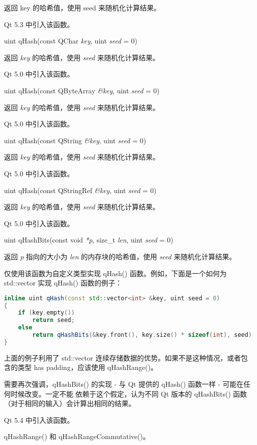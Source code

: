 返回 key 的哈希值，使用 seed 来随机化计算结果。

Qt 5.3 中引入该函数。

uint qHash(const QChar \emph{key}, uint \emph{seed} = 0)

返回 \emph{key} 的哈希值，使用 \emph{seed} 来随机化计算结果。

Qt 5.0 中引入该函数。

uint qHash(const QByteArray \emph{\&key},  uint \emph{seed} = 0)

返回 \emph{key} 的哈希值，使用 \emph{seed} 来随机化计算结果。

Qt 5.0 中引入该函数。

uint qHash(const QString \emph{\&key}, uint \emph{seed} = 0)

返回 \emph{key} 的哈希值，使用 \emph{seed} 来随机化计算结果。

Qt 5.0 中引入该函数。

uint qHash(const QStringRef \emph{\&key}, uint \emph{seed} = 0)

返回 \emph{key} 的哈希值，使用 \emph{seed} 来随机化计算结果。

Qt 5.0 中引入该函数。

uint qHashBits(const void \emph{*p}, size\_t \emph{len}, uint \emph{seed} = 0)

返回 \emph{p} 指向的大小为 \emph{len} 的内存块的哈希值，使用 \emph{seed} 来随机化计算结果。

仅使用该函数为自定义类型实现 qHash() 函数。例如，下面是一个如何为 std::vector 实现 qHash() 函数的例子：


\begin{lstlisting}[language=C++]
inline uint qHash(const std::vector<int> &key, uint seed = 0)
{
    if (key.empty())
        return seed;
    else
        return qHashBits(&key.front(), key.size() * sizeof(int), seed);
}
\end{lstlisting}

上面的例子利用了 std::vector 连续存储数据的优势。如果不是这种情况，或者包含的类型 has padding，应该使用 qHashRange()。

需要再次强调，qHashBits() 的实现 - 与 Qt 提供的 qHash() 函数一样 - 可能在任何时候改变。一定不能 依赖于这个假定，认为不同 Qt 版本的 qHashBits() 函数（对于相同的输入）会计算出相同的结果。

Qt 5.4 中引入该函数。


\begin{seeAlso}
qHashRange() 和 qHashRangeCommutative()。
\end{seeAlso}

